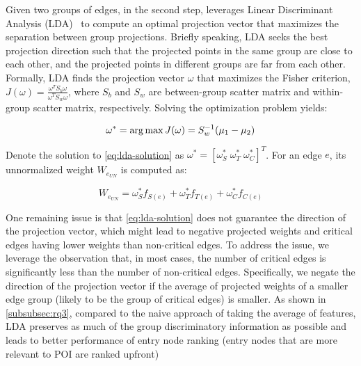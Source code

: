 Given two groups of edges, in the second step, \tool leverages Linear Discriminant Analysis (LDA)~\cite{Mika99fisherdiscriminant} to compute an optimal projection vector that maximizes the separation between group projections.
%
Briefly speaking, LDA seeks the best projection direction such that the projected points in the same group are close to each other, and the projected points in different groups are far from each other.
%
Formally, LDA finds the projection vector $\omega$ that maximizes the Fisher criterion, $J(\omega) = \frac{\omega^TS_b\omega}{\omega^TS_w\omega}$, where $S_b$ and $S_w$ are between-group scatter matrix and within-group scatter matrix, respectively. 
%
Solving the optimization problem yields:

\begin{equation}
    \label{eq:lda-solution}
    \omega^* = \operatorname*{arg\,max} J(\omega) = S_w^{-1}(\mu_1-\mu_2)
\end{equation}

Denote the solution to \cref{eq:lda-solution} as $\omega^{*} = [\omega^{*}_{S}\; \omega^{*}_{T}\; \omega^{*}_{C}]^T$.
For an edge $e$, its unnormalized weight $W_{e_{UN}}$ is computed as:

\begin{equation}
    \label{eq:projection}
    W_{e_{UN}} = \omega^{*}_{S} f_{S(e)} + \omega^{*}_{T} f_{T(e)} + \omega^{*}_{C} f_{C(e)}
\end{equation}

One remaining issue is that \cref{eq:lda-solution} does not guarantee the direction of the projection vector, which might lead to negative projected weights and critical edges having lower weights than non-critical edges.
To address the issue, we leverage the observation that, in most cases, the number of critical edges is significantly less than the number of non-critical edges.
Specifically, we negate the direction of the projection vector if the average of projected weights of a smaller edge group (likely to be the group of critical edges) is smaller.
%
As shown in \cref{subsubsec:rq3}, compared to the naive approach of taking the average of features, LDA preserves as much of the group discriminatory information as possible and leads to better performance of entry node ranking (\ie entry nodes that are more relevant to POI are ranked upfront)


